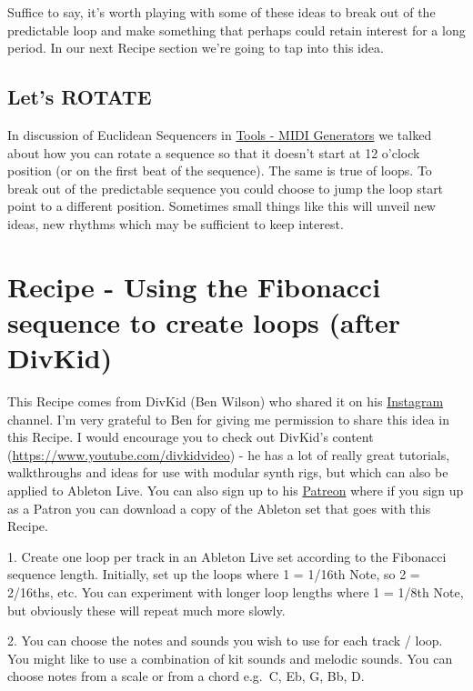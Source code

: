 \documentclass[
  12pt,
  letterpaper,
  oneside,
  open=any]{scrbook}
\begin{document}
Suffice to say, it's worth playing with some of these ideas to break out
of the predictable loop and make something that perhaps could retain
interest for a long period. In our next Recipe section we're going to
tap into this idea.

\section{Let's ROTATE}\label{lets-rotate}

In discussion of Euclidean Sequencers in
\hyperref[Chapter-012-Tools-MIDI_Generators]{Tools - MIDI Generators} we
talked about how you can rotate a sequence so that it doesn't start at
12 o'clock position (or on the first beat of the sequence). The same is
true of loops. To break out of the predictable sequence you could choose
to jump the loop start point to a different position. Sometimes small
things like this will unveil new ideas, new rhythms which may be
sufficient to keep interest.


\chapter{Recipe - Using the Fibonacci sequence to create loops (after
DivKid)}\label{Chapter-022-Recipe-Fibonacci_loops}

This Recipe comes from DivKid (Ben Wilson) who shared it on his
\href{https://www.instagram.com/divkidvideo}{Instagram} channel. I'm
very grateful to Ben for giving me permission to share this idea in this
Recipe. I would encourage you to check out DivKid's content
(\url{https://www.youtube.com/divkidvideo}) - he has a lot of really
great tutorials, walkthroughs and ideas for use with modular synth rigs,
but which can also be applied to Ableton Live. You can also sign up to
his \href{https://www.patreon.com/DivKid}{Patreon} where if you sign up
as a Patron you can download a copy of the Ableton set that goes with
this Recipe.

1. Create one loop per track in an Ableton Live set according to the
Fibonacci sequence length. Initially, set up the loops where 1 = 1/16th
Note, so 2 = 2/16ths, etc. You can experiment with longer loop lengths
where 1 = 1/8th Note, but obviously these will repeat much more slowly.

2. You can choose the notes and sounds you wish to use for each track /
loop. You might like to use a combination of kit sounds and melodic
sounds. You can choose notes from a scale or from a chord e.g.~C, Eb, G,
Bb, D.
\end{document}
